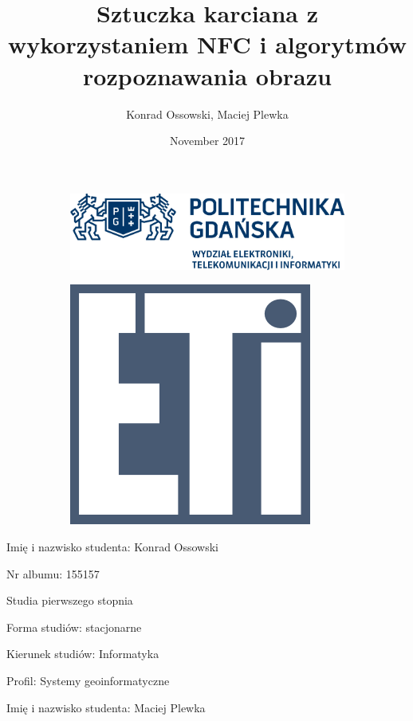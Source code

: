 \documentclass{article}
\title{Sztuczka karciana z wykorzystaniem NFC i algorytmów rozpoznawania obrazu}
\author{Konrad Ossowski, Maciej Plewka }
\date{November 2017}
\numberwithin{equation}{section}
\begin{document}
\justifying %

\sffamily

 \setlength{\parindent}{1.25cm}


\begin{mainPage}

\begin{figure}
\centering
\begin{subfigure}{.5\textwidth}
  \includegraphics[scale=0.3,left]{pg_logo.png}
\end{subfigure}%
\begin{subfigure}{.5\textwidth}
  \includegraphics[scale=0.3,right]{eti.png}
\end{subfigure}
\end{figure}

\vspace*{10mm}

\begin{multicols}{2}
\begin{flushleft}
Imię i nazwisko studenta: Konrad Ossowski

Nr albumu: 155157

Studia pierwszego stopnia

Forma studiów: stacjonarne

Kierunek studiów: Informatyka

Profil: Systemy geoinformatyczne
 \end{flushleft}
\columnbreak
 \begin{flushleft}
Imię i nazwisko studenta: Maciej Plewka


\end{flushleft}
\end{multicols}
\end{mainPage}
\end{document}
